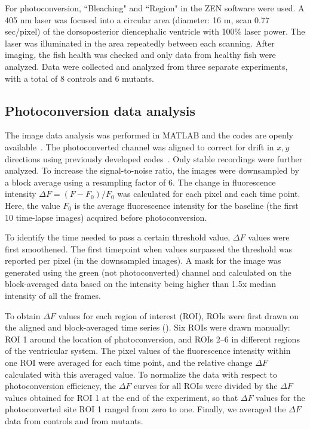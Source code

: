 \documentclass{WileyMSP-template}
\begin{document}
For photoconversion, ``Bleaching" and ``Region" in the ZEN software
were used. A 405 nm laser was focused into a circular area (diameter: 16 \textmu m, scan 0.77 \textmu sec/pixel)
of the dorsoposterior diencephalic ventricle with 100\% laser power.
The laser was illuminated in the area repeatedly between each scanning.
After imaging, the fish health was checked and only data from healthy fish were analyzed.
Data were collected and analyzed from three separate experiments,
with a total of 8 controls and 6 mutants.

\subsection{Photoconversion data analysis}
The image data analysis was performed in MATLAB and the codes are
openly available~.  The
photoconverted channel was aligned to correct for drift in $x,y$
directions using previously developed
codes~\cite{Reiten2017Motile-Cilia-MediatedComputations,
  Ringers2023NovelEpithelia}.  Only stable recordings were further
analyzed.  To increase the signal-to-noise ratio, the images were
downsampled by a block average using a resampling factor of 6. %
The change in fluorescence intensity
$\Delta F = (F-F_0)/F_0$ was
calculated for each pixel and each time point.  Here, the
value $F_0$ is the average fluorescence intensity for the baseline
(the first 10 time-lapse images) acquired before photoconversion.

To identify the time needed to pass a certain threshold value,
$\Delta F$ values were first smoothened.
The first timepoint when values surpassed the threshold was reported
per pixel (in the downsampled images).
A mask for the image was generated using the green (not photoconverted)
channel and calculated on the block-averaged data based on the intensity
being higher than 1.5x median intensity of all the frames.

To obtain $\Delta F$ values for each region of interest (ROI), ROIs were
first drawn on the aligned and block-averaged time series ().
Six ROIs were drawn manually: ROI 1 around the location of photoconversion,
and ROIs 2--6 in different regions of the ventricular system.
The pixel values of the fluorescence intensity within one ROI were
averaged for each time point, and the relative change $\Delta F$ calculated with this averaged value.
To normalize the data with respect to photoconversion efficiency, the
$\Delta F$ curves for all ROIs were divided by the $\Delta F$ values
obtained for ROI 1 at the end of the experiment,
so that $\Delta F$ values for the photoconverted site ROI 1 ranged from
zero to one. Finally, we averaged the $\Delta F$ data from controls and from mutants.
\end{document}
